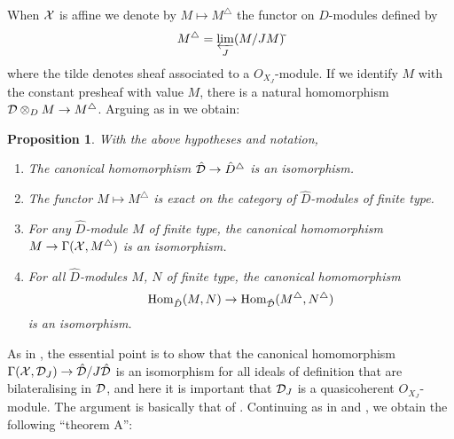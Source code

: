 \documentclass{article}
\theoremstyle{change}
\newtheorem{prop}[subsubsection]{Proposition}
\numberwithin{equation}{subsubsection}
\begin{document}
When ${\cal X}$ is affine we denote by $M\mapsto M^\triangle$ the functor
on $D$-modules defined by
\begin{equation}
  \label{eq:associated-sheaf}
  M^\triangle=\varprojlim_J(M/JM)\tilde{\relax}
\end{equation}
where the tilde denotes sheaf associated to a $O_{X_J}$-module. If we
identify $M$ with the constant presheaf with value $M$, there is a
natural homomorphism ${\cal D}\otimes_DM\to M^\triangle$. Arguing as in
\cite[3.3.7--8]{berthelot:1996} we obtain:

\begin{prop}\label{prop:triangle-functor}
  With the above hypotheses and notation,
  \begin{enumerate}
  \item The canonical homomorphism $\hat{\cal D}\to\hat D^\triangle$ is an
    isomorphism.
  \item The functor $M\mapsto M^\triangle$ is exact on the category of
    $\hat D$-modules of finite type.
  \item For any $\hat D$-module $M$ of finite type, the canonical
    homomorphism $M\to\Gamma({\cal X},M^\triangle)$ is an isomorphism.
  \item For all $\hat D$-modules $M$, $N$ of finite type, the canonical
    homomorphism
    \begin{displaymath}
      {\operatorname{Hom}}_{\hat D}(M,N)\to{\operatorname{Hom}}_{\hat{\cal D}}(M^\triangle,N^\triangle)
    \end{displaymath}
    is an isomorphism.
  \end{enumerate}
\end{prop}

As in \cite[3.3.8]{berthelot:1996}, the essential point is to show
that the canonical homomorphism $\Gamma({\cal X},{\cal D}_J)\to\hat{\cal D}/J\hat{\cal D}$ is an
isomorphism for all ideals of definition that are bilateralising in
${\cal D}$, and here it is important that ${\cal D}_J$ is a quasicoherent
$O_{X_J}$-module. The argument is basically that of \cite[I
10.10.2]{EGA}. Continuing as in \cite[\S3.3]{berthelot:1996} and
\cite[I 10.10]{EGA}, we obtain the following ``theorem A'':
\end{document}

